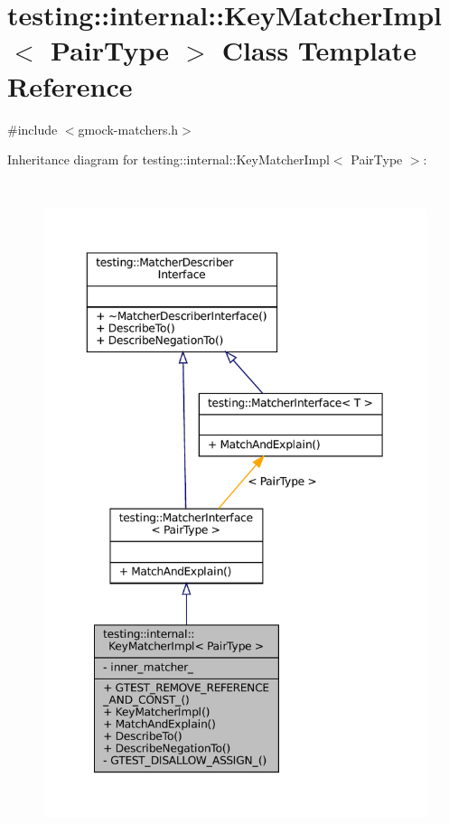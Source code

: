 \hypertarget{classtesting_1_1internal_1_1KeyMatcherImpl}{}\section{testing\+:\+:internal\+:\+:Key\+Matcher\+Impl$<$ Pair\+Type $>$ Class Template Reference}
\label{classtesting_1_1internal_1_1KeyMatcherImpl}


{\ttfamily \#include $<$gmock-\/matchers.\+h$>$}



Inheritance diagram for testing\+:\+:internal\+:\+:Key\+Matcher\+Impl$<$ Pair\+Type $>$\+:
\nopagebreak
\begin{figure}[H]
\begin{center}
\leavevmode
\includegraphics[height=550pt]{classtesting_1_1internal_1_1KeyMatcherImpl__inherit__graph}
\end{center}
\end{figure}


